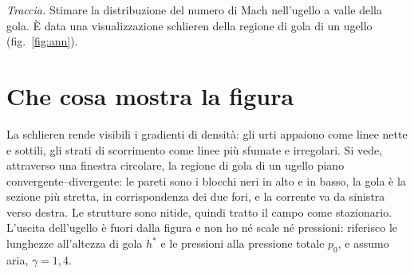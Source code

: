 

\graphicspath{{../../svolgimenti/2026-09-14_E02_ugello_schlieren/figure/}}



\maketitle

\emph{Traccia.} Stimare la distribuzione del numero di Mach nell'ugello a valle della gola. È data una
visualizzazione schlieren della regione di gola di un ugello (fig.~\ref{fig:ann}).

\section*{Che cosa mostra la figura}
La schlieren rende visibili i gradienti di densità: gli urti appaiono come linee nette e sottili, gli strati di
scorrimento come linee più sfumate e irregolari. Si vede, attraverso una finestra circolare, la regione di gola di un
ugello piano convergente--divergente: le pareti sono i blocchi neri in alto e in basso, la gola è la sezione più
stretta, in corrispondenza dei due fori, e la corrente va da sinistra verso destra. Le strutture sono nitide, quindi
tratto il campo come stazionario. L'uscita dell'ugello è fuori dalla figura e non ho né scale né pressioni: riferisco
le lunghezze all'altezza di gola $h^*$ e le pressioni alla pressione totale $p_0$, e assumo aria, $\gamma=1{,}4$.


